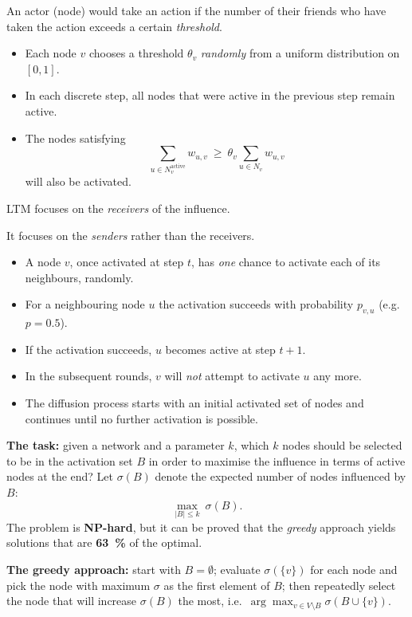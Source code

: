 \documentclass[11pt,a4paper]{article}
\theoremstyle{definition}
\begin{document}
\begin{defbox}
An actor (node) would take an action if the number of their friends who have taken the action exceeds
a certain \emph{threshold}.
\begin{itemize}
\item Each node $v$ chooses a threshold $\theta_v$ \emph{randomly} from a uniform distribution on
      $[0,1]$.
\item In each discrete step, all nodes that were active in the previous step remain active.
\item The nodes satisfying
      \[ \sum_{u\in N_v^{\text{active}}} w_{u,v}\ \ge\ \theta_v
         \sum_{u\in N_v} w_{u,v} \]
      will also be activated.
\end{itemize}
LTM focuses on the \emph{receivers} of the influence.
\end{defbox}

\begin{defbox}
It focuses on the \emph{senders} rather than the receivers.
\begin{itemize}
\item A node $v$, once activated at step $t$, has \emph{one} chance to activate each of its
      neighbours, randomly.
\item For a neighbouring node $u$ the activation succeeds with probability $p_{v,u}$ (e.g.\
      $p=0.5$).
\item If the activation succeeds, $u$ becomes active at step $t+1$.
\item In the subsequent rounds, $v$ will \emph{not} attempt to activate $u$ any more.
\item The diffusion process starts with an initial activated set of nodes and continues until no
      further activation is possible.
\end{itemize}
\end{defbox}

\begin{defbox}
\textbf{The task:} given a network and a parameter $k$, which $k$ nodes should be selected to be in
the activation set $B$ in order to maximise the influence in terms of active nodes at the end? Let
$\sigma(B)$ denote the expected number of nodes influenced by $B$:
\[ \max_{|B|\le k}\ \sigma(B). \]
The problem is \textbf{NP-hard}, but it can be proved that the \emph{greedy} approach yields
solutions that are \textbf{63~\%} of the optimal.

\textbf{The greedy approach:} start with $B=\emptyset$; evaluate $\sigma(\{v\})$ for each node and
pick the node with maximum $\sigma$ as the first element of $B$; then repeatedly select the node
that will increase $\sigma(B)$ the most, i.e.\ $\arg\max_{v\in V\setminus B}\sigma(B\cup\{v\})$.
\end{defbox}
\end{document}

